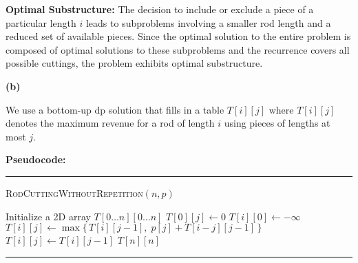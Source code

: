 \documentclass[11pt]{article}
\begin{document}
        \textbf{Optimal Substructure:}  
        The decision to include or exclude a piece of a particular length \(i\) leads to subproblems involving a smaller rod length and a reduced set of available pieces. Since the optimal solution to the entire problem is composed of optimal solutions to these subproblems and the recurrence covers all possible cuttings, the problem exhibits optimal substructure.
        
        \vspace{1em}
        
        \textbf{(b)}
        
        We use a bottom-up dp solution that fills in a table \(T[i][j]\) where \(T[i][j]\) denotes the maximum revenue for a rod of length \(i\) using pieces of lengths at most \(j\).

        \bigskip
        
        \textbf{Pseudocode:}

        \par\noindent\rule{\textwidth}{0.4pt}
        \smallskip        
        \textsc{RodCuttingWithoutRepetition}$(n, p)$
        \begin{algorithmic}[1]
            \STATE Initialize a 2D array $T[0 \ldots n][0 \ldots n]$
                \STATE $T[0][j] \gets 0$
            \ENDFOR
                \STATE $T[i][0] \gets -\infty$
            \ENDFOR
                        \STATE $T[i][j] \gets \max\{\,T[i][j-1],\; p[j] + T[i-j][j-1]\,\}$
                    \ELSE
                        \STATE $T[i][j] \gets T[i][j-1]$
                    \ENDIF
                \ENDFOR
            \ENDFOR
            \RETURN $T[n][n]$
        \end{algorithmic}
        \smallskip
        \par\noindent\rule{\textwidth}{0.4pt}
        
\end{document}
